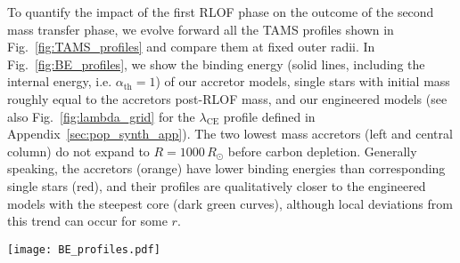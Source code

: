 \documentclass[twocolumn,twocolappendix,trackchanges]{aastex63}
\DeclareRobustCommand{\Eqref}[1]{Eq.~\ref{#1}}
\DeclareRobustCommand{\Figref}[1]{Fig.~\ref{#1}}
\newcommand{\todo}[1]{{\large $\blacksquare$~\textbf{\color{red}[#1]}}~$\blacksquare$}
\begin{document}
To quantify the impact of the first RLOF phase on the outcome of the
second mass transfer phase, we evolve forward all the TAMS profiles
shown in \Figref{fig:TAMS_profiles} and compare them at fixed outer
radii. %
In \Figref{fig:BE_profiles}, we show the binding energy (solid lines,
including the internal energy, i.e. $\alpha_\mathrm{th}=1$) %
of our accretor models, single stars with initial mass roughly equal
to the accretors post-RLOF mass, and our engineered models (see also
\Figref{fig:lambda_grid} for the $\lambda_\mathrm{CE}$ profile defined in Appendix~\ref{sec:pop_synth_app}). The two
lowest mass accretors (left and central column) do not expand to
$R=1000\, R_\odot$ before carbon depletion. Generally speaking, the
accretors (orange) have lower binding energies than corresponding
single stars (red), and their profiles are qualitatively closer to the
engineered models with the steepest core (dark green curves), although
local deviations from this trend can occur for some $r$.

\begin{figure*}[hbtp]
  \texttt{[image: BE\_profiles.pdf]}
  \caption{Binding energy profile at fixed radii (right y-axis) as a
    function of radial mass coordinate. We only show profiles with
    $\alpha_\mathrm{th}=1$, that is accounting for the internal energy
    content of the star. Orange, red, and other colors show
    respectively the accretor models, single stars of same post-RLOF
    total mass, and engineered models with varying CEB steepness.
    Titles indicates the pre-RLOF and approximate post-RLOF accretor
    masses, and vertical gray dashed lines mark the total radius $R$
    of these models.}
  \label{fig:BE_profiles}
\end{figure*}
\end{document}
